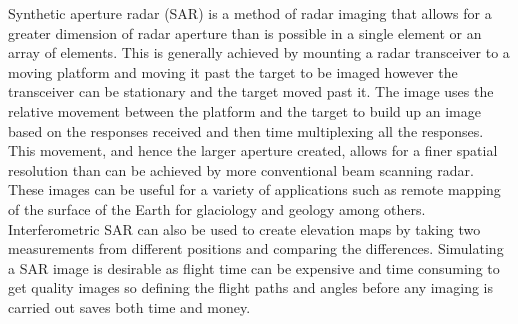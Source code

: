 Synthetic aperture radar (SAR) is a method of radar imaging that allows for a greater dimension of radar aperture than is possible in a single element or an array of elements. This is generally achieved by mounting a radar transceiver to a moving platform and moving it past the target to be imaged however the transceiver can be stationary and the target moved past it. The image uses the relative movement between the platform and the target to build up an image based on the responses received and then time multiplexing all the responses. This movement, and hence the larger aperture created, allows for a finer spatial resolution than can be achieved by more conventional beam scanning radar. These images can be useful for a variety of applications such as remote mapping of the surface of the Earth for glaciology and geology among others. Interferometric SAR can also be used to create elevation maps by taking two measurements from different positions and comparing the differences.
Simulating a SAR image is desirable as flight time can be expensive and time consuming to get quality images so defining the flight paths and angles before any imaging is carried out saves both time and money.
\par
